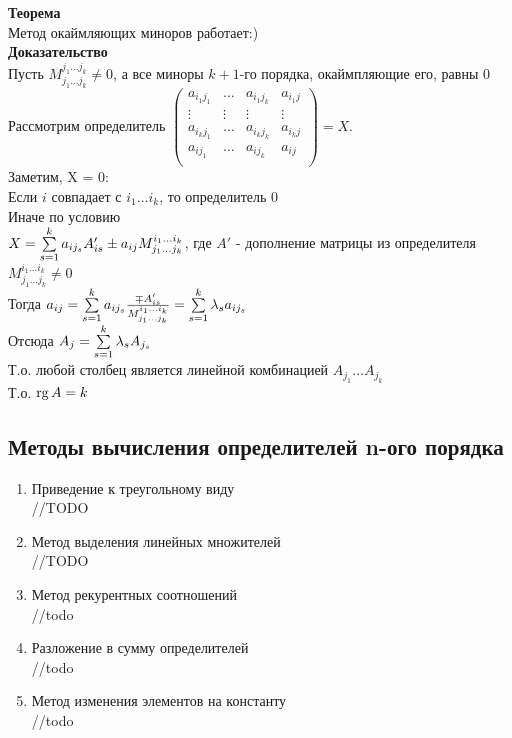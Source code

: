 \documentclass[12pt]{article}
\begin{document}
\textbf{Теорема}\\
Метод окаймляющих миноров работает:)\\
\textbf{Доказательство}\\
Пусть $M_{j_1\ldots j_k}^{j_1\ldots j_k} \neq 0$, а все миноры $k+1$-го порядка, окаймпляющие его, равны 0\\
Рассмотрим определитель $\begin{pmatrix}
    a_{i_1j_1} & \ldots & a_{i_1j_k} & a_{i_1j}\\
    \vdots & \vdots & \vdots & \vdots\\
    a_{i_kj_1} & \ldots & a_{i_kj_k} & a_{i_kj}\\
    a_{ij_1} & \ldots & a_{ij_k} & a_{ij}\\
\end{pmatrix} = X$.\\
Заметим, X = 0:\\
Если $i$ совпадает с $i_1 \ldots i_k$, то определитель 0\\
Иначе по условию\\
$X = \sum\limits_{s=1}^k a_{ij_s}A'_{is} \pm a_{ij}M_{j_1\ldots j_k}^{i_1\ldots i_k}$, где $A'$ - дополнение матрицы из определителя\\
$M_{j_1\ldots j_k}^{i_1\ldots i_k} \neq 0$\\
Тогда $a_{ij} = \sum\limits_{s=1}^k a_{ij_s} \frac{\mp A'_{is}}{M_{j_1\ldots j_k}^{i_1\ldots i_k}} = \sum\limits_{s=1}^k \lambda_s a_{ij_s}$\\
Отсюда $A_j = \sum\limits_{s=1}^k\lambda_s A_{j_s}$\\
Т.о. любой столбец является линейной комбинацией $A_{j_1}\ldots A_{j_k}$\\
Т.о. $\operatorname{rg} A = k$
\subsection{Методы вычисления определителей n-ого порядка}
\begin{enumerate}
    \item Приведение к треугольному виду\\
    //TODO
    \item Метод выделения линейных множителей\\
    //TODO
    \item Метод рекурентных соотношений\\
    //todo
    \item Разложение в сумму определителей\\
    //todo
    \item Метод изменения элементов на константу\\
    //todo
\end{enumerate}
\end{document}
